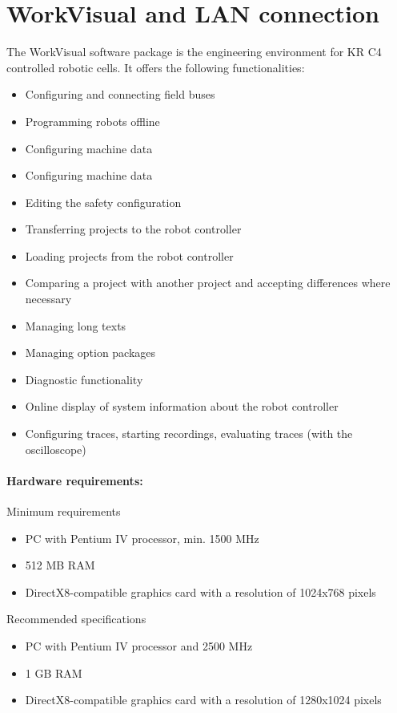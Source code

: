 		\section{WorkVisual and LAN connection}
		The WorkVisual software package is the engineering environment for KR C4 controlled robotic cells. It offers the following functionalities:
		\begin{itemize}
			\item Configuring and connecting field buses
			\item Programming robots offline
			\item Configuring machine data
			\item Configuring machine data
			\item Editing the safety configuration
			\item Transferring projects to the robot controller
			\item Loading projects from the robot controller
			\item Comparing a project with another project and accepting differences where necessary
			\item Managing long texts
			\item Managing option packages
			\item Diagnostic functionality
			\item Online display of system information about the robot controller
			\item Configuring traces, starting recordings, evaluating traces (with the oscilloscope)
		\end{itemize}
		
			\paragraph{Hardware requirements:}
			Minimum requirements 
				\begin{itemize}
					\item PC with Pentium IV processor, min. 1500 MHz
					\item 512 MB RAM
					\item DirectX8-compatible graphics card with a resolution of 1024x768 pixels
				\end{itemize}
			Recommended specifications
				\begin{itemize}
					\item PC with Pentium IV processor and 2500 MHz
					\item 1 GB RAM
					\item DirectX8-compatible graphics card with a resolution of 1280x1024 pixels
				\end{itemize}
